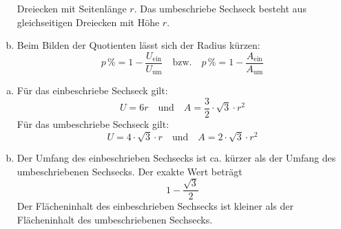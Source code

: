 \begin{exercise}
\begin{enumerate}[a)]
            Dreiecken mit Seitenlänge $r$.
            Das umbeschriebe Sechseck besteht aus gleichseitigen
            Dreiecken mit Höhe $r$.
      \item Beim Bilden der Quotienten lässt sich der Radius kürzen:
            \begin{equation*}
              p\,\%=1-\frac{U_\text{ein}}{U_\text{um}}
              \quad\text{bzw.}\quad
              p\,\%=1-\frac{A_\text{ein}}{A_\text{um}}
            \end{equation*}
    \end{enumerate}
  \fi
  \ifoutcome\outcome\par
    \begin{enumerate}[a)]
      \item Für das einbeschriebe Sechseck gilt:
            \begin{equation*}
              U=6r
              \quad\text{und}\quad
              A=\frac{3}{2}\cdot\sqrt{3}\cdot r^2
            \end{equation*}
            Für das umbeschriebe Sechseck gilt:
            \begin{equation*}
              U=4\cdot\sqrt{3}\cdot r
              \quad\text{und}\quad
              A=2\cdot\sqrt{3}\cdot r^2
            \end{equation*}
      \item Der Umfang des einbeschrieben Sechsecks ist
            ca.  kürzer als der Umfang des
            umbeschriebenen Sechsecks. Der exakte Wert beträgt
            \begin{equation*}
              1-\frac{\sqrt{3}}{2}
            \end{equation*}
            Der Flächeninhalt des einbeschrieben Sechsecks ist
             kleiner als der Flächeninhalt des
            umbeschriebenen Sechsecks.
    \end{enumerate}
  \fi
\end{exercise}

